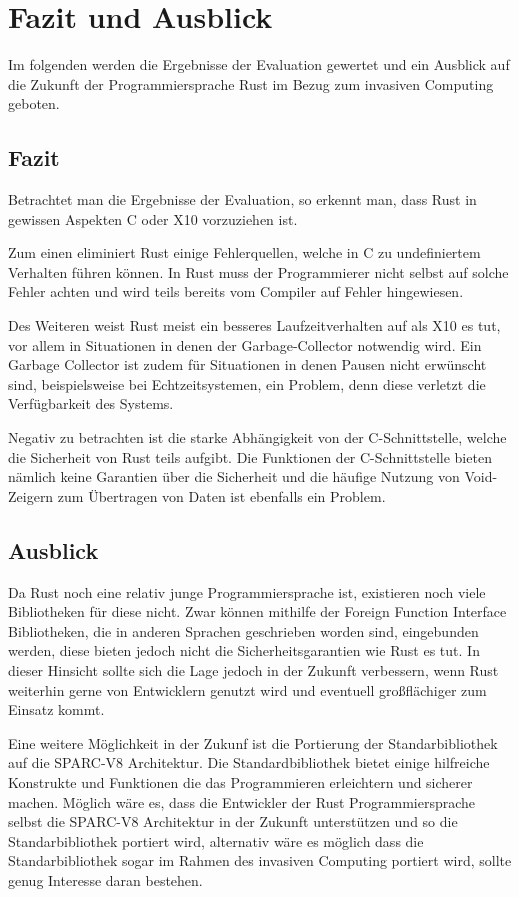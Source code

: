 \chapter{Fazit und Ausblick}\label{sec:conclusion}

Im folgenden werden die Ergebnisse der Evaluation gewertet und ein Ausblick auf die Zukunft der Programmiersprache Rust
im Bezug zum invasiven Computing geboten.

\section{Fazit}

Betrachtet man die Ergebnisse der Evaluation, so erkennt man, dass Rust in gewissen Aspekten C oder X10 vorzuziehen ist.

Zum einen eliminiert Rust einige Fehlerquellen, welche in C zu undefiniertem Verhalten führen können. In Rust muss der
Programmierer nicht selbst auf solche Fehler achten und wird teils bereits vom Compiler auf Fehler hingewiesen.

Des Weiteren weist Rust meist ein besseres Laufzeitverhalten auf als X10 es tut, vor allem in Situationen
in denen der Garbage-Collector notwendig wird. Ein Garbage Collector ist zudem für Situationen in denen Pausen nicht
erwünscht sind, beispielsweise bei Echtzeitsystemen, ein Problem, denn diese verletzt die Verfügbarkeit des Systems.

Negativ zu betrachten ist die starke Abhängigkeit von der C-Schnittstelle, welche die Sicherheit von Rust teils aufgibt.
Die Funktionen der C-Schnittstelle bieten nämlich keine Garantien über die Sicherheit und die häufige Nutzung von
Void-Zeigern zum Übertragen von Daten ist ebenfalls ein Problem.

\section{Ausblick}

Da Rust noch eine relativ junge Programmiersprache ist, existieren noch viele Bibliotheken für diese nicht. Zwar können mithilfe
der Foreign Function Interface Bibliotheken, die in anderen Sprachen geschrieben worden sind, eingebunden werden, diese bieten jedoch
nicht die Sicherheitsgarantien wie Rust es tut. In dieser Hinsicht sollte sich die Lage jedoch in der Zukunft verbessern, wenn Rust
weiterhin gerne von Entwicklern genutzt wird und eventuell großflächiger zum Einsatz kommt.

Eine weitere Möglichkeit in der Zukunf ist die Portierung der Standarbibliothek auf die SPARC-V8 Architektur. Die Standardbibliothek
bietet einige hilfreiche Konstrukte und Funktionen die das Programmieren erleichtern und sicherer machen. Möglich wäre es, dass die 
Entwickler der Rust Programmiersprache selbst die SPARC-V8 Architektur in der Zukunft unterstützen und so die
Standarbibliothek portiert wird, alternativ wäre es möglich dass die Standarbibliothek sogar im Rahmen des invasiven Computing
portiert wird, sollte genug Interesse daran bestehen.
